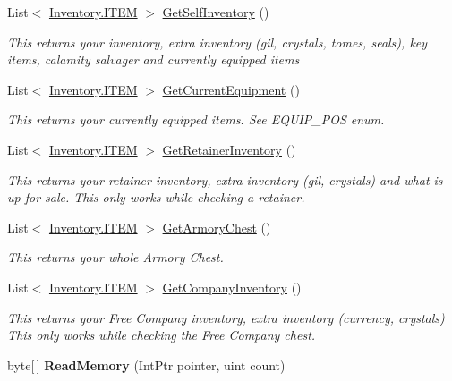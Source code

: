 \begin{DoxyCompactItemize}
List$<$ \hyperlink{structffxivlib_1_1_inventory_1_1_i_t_e_m}{Inventory.\-I\-T\-E\-M} $>$ \hyperlink{classffxivlib_1_1_f_f_x_i_v_l_i_b_a414e7d6cf920df6a210b28979d4e256b}{Get\-Self\-Inventory} ()
\begin{DoxyCompactList}\small\item\em This returns your inventory, extra inventory (gil, crystals, tomes, seals), key items, calamity salvager and currently equipped items \end{DoxyCompactList}\item 
List$<$ \hyperlink{structffxivlib_1_1_inventory_1_1_i_t_e_m}{Inventory.\-I\-T\-E\-M} $>$ \hyperlink{classffxivlib_1_1_f_f_x_i_v_l_i_b_a4ad97fc36d32d6c56d1ea7c12b5b211e}{Get\-Current\-Equipment} ()
\begin{DoxyCompactList}\small\item\em This returns your currently equipped items. See E\-Q\-U\-I\-P\-\_\-\-P\-O\-S enum. \end{DoxyCompactList}\item 
List$<$ \hyperlink{structffxivlib_1_1_inventory_1_1_i_t_e_m}{Inventory.\-I\-T\-E\-M} $>$ \hyperlink{classffxivlib_1_1_f_f_x_i_v_l_i_b_ae3c5c77d26ed45d4be8ddd8e0caf3bb9}{Get\-Retainer\-Inventory} ()
\begin{DoxyCompactList}\small\item\em This returns your retainer inventory, extra inventory (gil, crystals) and what is up for sale. This only works while checking a retainer. \end{DoxyCompactList}\item 
List$<$ \hyperlink{structffxivlib_1_1_inventory_1_1_i_t_e_m}{Inventory.\-I\-T\-E\-M} $>$ \hyperlink{classffxivlib_1_1_f_f_x_i_v_l_i_b_a1b51a968a6d6e59d5a0a3b265d19a742}{Get\-Armory\-Chest} ()
\begin{DoxyCompactList}\small\item\em This returns your whole Armory Chest. \end{DoxyCompactList}\item 
List$<$ \hyperlink{structffxivlib_1_1_inventory_1_1_i_t_e_m}{Inventory.\-I\-T\-E\-M} $>$ \hyperlink{classffxivlib_1_1_f_f_x_i_v_l_i_b_a9e3b1f4f0b1c203583e6c38a5bcf9c0c}{Get\-Company\-Inventory} ()
\begin{DoxyCompactList}\small\item\em This returns your Free Company inventory, extra inventory (currency, crystals) This only works while checking the Free Company chest. \end{DoxyCompactList}\item 
\hypertarget{classffxivlib_1_1_f_f_x_i_v_l_i_b_a2e19fa6a85db14f2b15ff4038a33cd61}{byte\mbox{[}$\,$\mbox{]} {\bfseries Read\-Memory} (Int\-Ptr pointer, uint count)}\label{classffxivlib_1_1_f_f_x_i_v_l_i_b_a2e19fa6a85db14f2b15ff4038a33cd61}


\end{DoxyCompactItemize}
